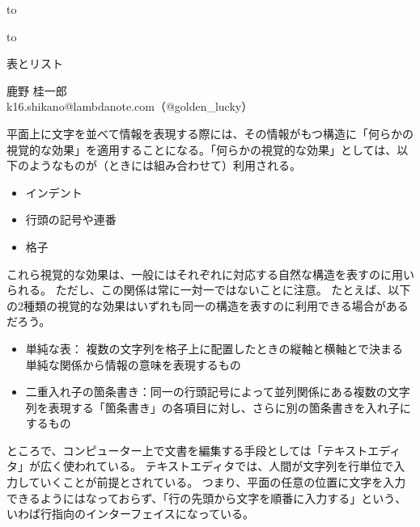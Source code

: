 \documentclass[uplatex,12pt,dvipdfmx]{jsarticle}
\begin{document}
\vspace*{-3\baselineskip}

\hbox to\textwidth{\small\hfil 2021年11月13日}\par
\hbox to

\vspace{\baselineskip}

\begin{center}\large
表とリスト
\end{center}

\begin{center}
\small
鹿野 桂一郎\\[0pt]
\footnotesize
k16.shikano@lambdanote.com（@golden\_lucky）
\end{center}

\vspace{\baselineskip}

平面上に文字を並べて情報を表現する際には、その情報がもつ構造に「何らかの視覚的な効果」を適用することになる。「何らかの視覚的な効果」としては、以下のようなものが（ときには組み合わせて）利用される。

\begin{itemize}
\item インデント
\item 行頭の記号や連番
\item 格子
\end{itemize}

これら視覚的な効果は、一般にはそれぞれに対応する自然な構造を表すのに用いられる。
ただし、この関係は常に一対一ではないことに注意。
たとえば、以下の2種類の視覚的な効果はいずれも同一の構造を表すのに利用できる場合があるだろう。

\begin{itemize}
\item \textsf{単純な表}： 複数の文字列を格子上に配置したときの縦軸と横軸とで決まる単純な関係から情報の意味を表現するもの
\item \textsf{二重入れ子の箇条書き}：同一の行頭記号によって並列関係にある複数の文字列を表現する「箇条書き」の各項目に対し、さらに別の箇条書きを入れ子にするもの
\end{itemize}

ところで、コンピューター上で文書を編集する手段としては「テキストエディタ」が広く使われている。
テキストエディタでは、人間が文字列を行単位で入力していくことが前提とされている。
つまり、平面の任意の位置に文字を入力できるようにはなっておらず、「行の先頭から文字を順番に入力する」という、いわば行指向のインターフェイスになっている。
\end{document}
